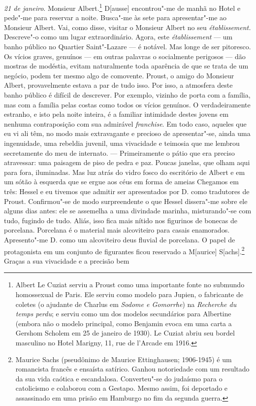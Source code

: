 \emph{21 de janeiro}. Monsieur Albert.\footnote{Albert Le Cuziat
  serviu a Proust como uma importante fonte no submundo homossexual de
  Paris. Ele serviu como modelo para Jupien, o fabricante de coletes (o
  ajudante de Charlus em \emph{Sodome e Gomorrhe}) na \emph{Recherche du
  temps perdu}; e serviu como um dos modelos secundários para Albertine
  (embora não o modelo principal, como Benjamin evoca em uma carta a
  Gershom Scholem em 25 de janeiro de 1930). Le Cuziat abriu seu bordel
  masculino no Hotel Marigny, 11, rue de l'Arcade em 1916. \versal{[N. E.]}}
D{[}ausse{]} encontrou"-me de manhã no Hotel e pede"-me para reservar a
noite. Busca"-me às sete para apresentar"-me ao Monsieur Albert. Vai, como
disse, visitar o Monsieur Albert no seu \emph{établissement.} Descreve"-o
como um lugar extraordinário. Agora, este \emph{établissement} --- um
banho público no Quartier Saint"-Lazare --- é notável. Mas longe de ser
pitoresco. Os vícios graves, genuínos --- em outras palavras o
socialmente perigosos --- dão mostras de modéstia, evitam naturalmente
toda aparência de que se trata de um negócio, podem ter mesmo algo de
comovente. Proust, o amigo do Monsieur Albert, provavelmente estava a
par de tudo isso. Por isso, a atmosfera deste banho público é difícil de
descrever. Por exemplo, vizinho de porta com a família, mas com a
família pelas costas como todos os vícios genuínos. O verdadeiramente
estranho, e isto pela noite inteira, é a familiar intimidade destes
jovens em nenhuma contraposição com sua admirável \emph{franchise}. Em
todo caso, aqueles que eu vi ali têm, no modo mais extravagante e
precioso de apresentar"-se, ainda uma ingenuidade, uma rebeldia juvenil,
uma vivacidade e teimosia que me lembrou secretamente do meu de
internato. --- Primeiramente o pátio que era preciso atravessar: uma
paisagem de piso de pedra e paz. Poucas janelas, que olham aqui para
fora, iluminadas. Mas luz atrás do vidro fosco do escritório de Albert e
em um sótão à esquerda que se ergue aos céus em forma de ameias Chegamos
em três: Hessel e eu tivemos que admitir ser apresentados por D. como
tradutores de Proust. Confirmou"-se de modo surpreendente o que Hessel
dissera"-me sobre ele alguns dias antes: ele se assemelha a uma divindade
marinha, misturando"-se com tudo, fugindo de tudo. Aliás, isso fica mais
nítido nos figurinos de bonecas de porcelana. Porcelana é o material
mais alcoviteiro para casais enamorados. Apresento"-me D. como um
alcoviteiro deus fluvial de porcelana. O papel de protagonista em um
conjunto de figurantes ficou reservado a M{[}aurice{]}
S{[}achs{]}.\footnote{Maurice Sachs (pseudônimo de Maurice
  Ettinghausen; 1906-1945) é um romancista francês e ensaísta satírico.
  Ganhou notoriedade com um resultado da sua vida caótica e escandalosa.
  Converteu"-se do judaísmo para o catolicismo e colaborou com a Gestapo.
  Mesmo assim, foi deportado e assassinado em uma prisão em Hamburgo no
  fim da segunda guerra. \versal{[N. E.]}} Graças a sua vivacidade e a precisão bem
